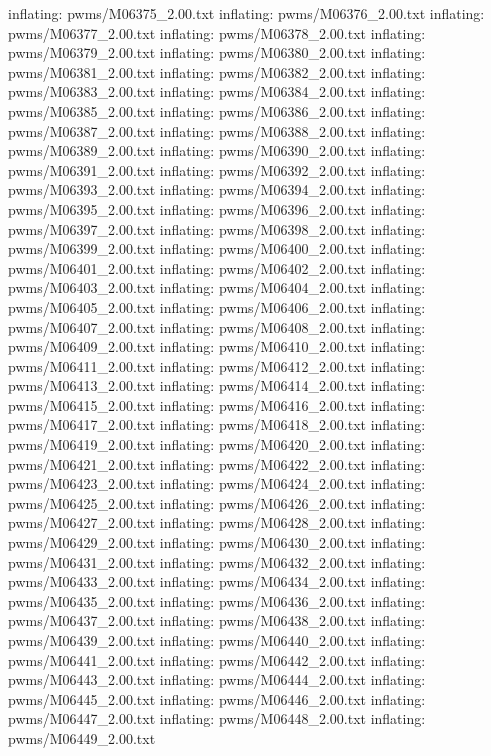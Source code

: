 \documentclass[letterpaper,10pt,english]{sphinxmanual}
\begin{document}
{\begin{sphinxVerbatim}[commandchars=\\\{\}]
  inflating: pwms/M06375\_2.00.txt
  inflating: pwms/M06376\_2.00.txt
  inflating: pwms/M06377\_2.00.txt
  inflating: pwms/M06378\_2.00.txt
  inflating: pwms/M06379\_2.00.txt
  inflating: pwms/M06380\_2.00.txt
  inflating: pwms/M06381\_2.00.txt
  inflating: pwms/M06382\_2.00.txt
  inflating: pwms/M06383\_2.00.txt
  inflating: pwms/M06384\_2.00.txt
  inflating: pwms/M06385\_2.00.txt
  inflating: pwms/M06386\_2.00.txt
  inflating: pwms/M06387\_2.00.txt
  inflating: pwms/M06388\_2.00.txt
  inflating: pwms/M06389\_2.00.txt
  inflating: pwms/M06390\_2.00.txt
  inflating: pwms/M06391\_2.00.txt
  inflating: pwms/M06392\_2.00.txt
  inflating: pwms/M06393\_2.00.txt
  inflating: pwms/M06394\_2.00.txt
  inflating: pwms/M06395\_2.00.txt
  inflating: pwms/M06396\_2.00.txt
  inflating: pwms/M06397\_2.00.txt
  inflating: pwms/M06398\_2.00.txt
  inflating: pwms/M06399\_2.00.txt
  inflating: pwms/M06400\_2.00.txt
  inflating: pwms/M06401\_2.00.txt
  inflating: pwms/M06402\_2.00.txt
  inflating: pwms/M06403\_2.00.txt
  inflating: pwms/M06404\_2.00.txt
  inflating: pwms/M06405\_2.00.txt
  inflating: pwms/M06406\_2.00.txt
  inflating: pwms/M06407\_2.00.txt
  inflating: pwms/M06408\_2.00.txt
  inflating: pwms/M06409\_2.00.txt
  inflating: pwms/M06410\_2.00.txt
  inflating: pwms/M06411\_2.00.txt
  inflating: pwms/M06412\_2.00.txt
  inflating: pwms/M06413\_2.00.txt
  inflating: pwms/M06414\_2.00.txt
  inflating: pwms/M06415\_2.00.txt
  inflating: pwms/M06416\_2.00.txt
  inflating: pwms/M06417\_2.00.txt
  inflating: pwms/M06418\_2.00.txt
  inflating: pwms/M06419\_2.00.txt
  inflating: pwms/M06420\_2.00.txt
  inflating: pwms/M06421\_2.00.txt
  inflating: pwms/M06422\_2.00.txt
  inflating: pwms/M06423\_2.00.txt
  inflating: pwms/M06424\_2.00.txt
  inflating: pwms/M06425\_2.00.txt
  inflating: pwms/M06426\_2.00.txt
  inflating: pwms/M06427\_2.00.txt
  inflating: pwms/M06428\_2.00.txt
  inflating: pwms/M06429\_2.00.txt
  inflating: pwms/M06430\_2.00.txt
  inflating: pwms/M06431\_2.00.txt
  inflating: pwms/M06432\_2.00.txt
  inflating: pwms/M06433\_2.00.txt
  inflating: pwms/M06434\_2.00.txt
  inflating: pwms/M06435\_2.00.txt
  inflating: pwms/M06436\_2.00.txt
  inflating: pwms/M06437\_2.00.txt
  inflating: pwms/M06438\_2.00.txt
  inflating: pwms/M06439\_2.00.txt
  inflating: pwms/M06440\_2.00.txt
  inflating: pwms/M06441\_2.00.txt
  inflating: pwms/M06442\_2.00.txt
  inflating: pwms/M06443\_2.00.txt
  inflating: pwms/M06444\_2.00.txt
  inflating: pwms/M06445\_2.00.txt
  inflating: pwms/M06446\_2.00.txt
  inflating: pwms/M06447\_2.00.txt
  inflating: pwms/M06448\_2.00.txt
  inflating: pwms/M06449\_2.00.txt

\end{sphinxVerbatim}}
\end{document}
